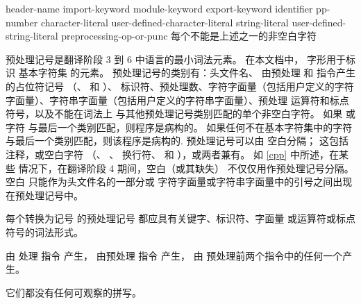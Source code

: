 %
\begin{bnf}
\br
    header-name\br
    import-keyword\br
    module-keyword\br
    export-keyword\br
    identifier\br
    pp-number\br
    character-literal\br
    user-defined-character-literal\br
    string-literal\br
    user-defined-string-literal\br
    preprocessing-op-or-punc\br
    \textnormal{每个不能是上述之一的非空白字符}
\end{bnf}

\pnum
预处理记号是翻译阶段 3 到 6 中语言的最小词法元素。
在本文档中，
字形用于标识
基本字符集 的元素。
预处理记号的类别有：头文件名、
由预处理  和  指令产生的占位符记号
（、 和 ）、
标识符、预处理数、字符字面量（包括用户定义的字符
字面量）、字符串字面量（包括用户定义的字符串字面量）、预处理
运算符和标点符号，以及不能在词法上
与其他预处理记号类别匹配的单个非空白字符。
如果  或  字符
与最后一个类别匹配，则程序是病构的。
如果任何不在基本字符集中的字符与最后一个类别匹配，则该程序是病构的.
预处理记号可以由
%
空白分隔；
%
这包括注释，或空白字符
（、
、
换行符、
 和
），或两者兼有。
如 \ref{cpp} 中所述，在某些
情况下，在翻译阶段 4 期间，空白（或其缺失）
不仅仅用作预处理记号分隔。空白
只能作为头文件名的一部分或
字符字面量或字符串字面量中的引号之间出现在预处理记号中。

\pnum
每个转换为记号 的预处理记号
都应具有关键字、标识符、字面量
或运算符或标点符号的词法形式。

\pnum
{} 由
处理  指令 产生，
 由预处理  指令 产生，
 由
预处理前两个指令中的任何一个产生。
\begin{note}
它们都没有任何可观察的拼写。
\end{note}

